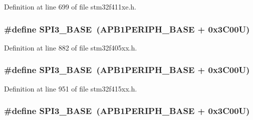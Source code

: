 Definition at line 699 of file stm32f411xe.\+h.

\subsubsection[{\texorpdfstring{S\+P\+I3\+\_\+\+B\+A\+SE}{SPI3_BASE}}]{\setlength{\rightskip}{0pt plus 5cm}\#define S\+P\+I3\+\_\+\+B\+A\+SE~({\bf A\+P\+B1\+P\+E\+R\+I\+P\+H\+\_\+\+B\+A\+SE} + 0x3\+C00\+U)}\hypertarget{group___peripheral__registers__structures_gae634fe8faa6922690e90fbec2fc86162}{}\label{group___peripheral__registers__structures_gae634fe8faa6922690e90fbec2fc86162}


Definition at line 882 of file stm32f405xx.\+h.

\subsubsection[{\texorpdfstring{S\+P\+I3\+\_\+\+B\+A\+SE}{SPI3_BASE}}]{\setlength{\rightskip}{0pt plus 5cm}\#define S\+P\+I3\+\_\+\+B\+A\+SE~({\bf A\+P\+B1\+P\+E\+R\+I\+P\+H\+\_\+\+B\+A\+SE} + 0x3\+C00\+U)}\hypertarget{group___peripheral__registers__structures_gae634fe8faa6922690e90fbec2fc86162}{}\label{group___peripheral__registers__structures_gae634fe8faa6922690e90fbec2fc86162}


Definition at line 951 of file stm32f415xx.\+h.

\subsubsection[{\texorpdfstring{S\+P\+I3\+\_\+\+B\+A\+SE}{SPI3_BASE}}]{\setlength{\rightskip}{0pt plus 5cm}\#define S\+P\+I3\+\_\+\+B\+A\+SE~({\bf A\+P\+B1\+P\+E\+R\+I\+P\+H\+\_\+\+B\+A\+SE} + 0x3\+C00\+U)}\hypertarget{group___peripheral__registers__structures_gae634fe8faa6922690e90fbec2fc86162}{}\label{group___peripheral__registers__structures_gae634fe8faa6922690e90fbec2fc86162}


